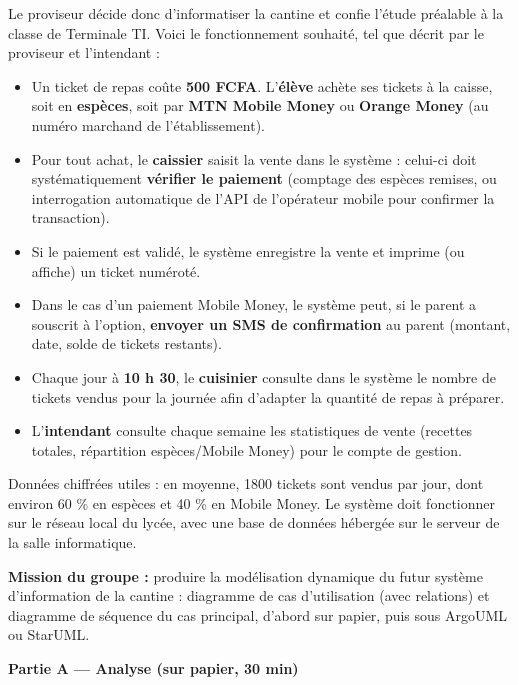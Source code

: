 \documentclass[11pt]{article}
\newcounter{popsec}
\newcounter{popsub}
\newcommand{\courssub}[1]{%
  \stepcounter{popsub}%
  \par\vspace{9pt}\noindent{\popxbold\fontsize{11.5}{13}\selectfont\color{popink}{\color{poporange}\thepopsec.\thepopsub}\hspace{6pt}#1}\par\nopagebreak\vspace{4pt}
}
\begin{document}
Le proviseur décide donc d'informatiser la cantine et confie l'étude préalable à la classe de Terminale TI. Voici le fonctionnement souhaité, tel que décrit par le proviseur et l'intendant :

\begin{itemize}
  \item Un ticket de repas coûte \textbf{500 FCFA}. L'\textbf{élève} achète ses tickets à la caisse, soit en \textbf{espèces}, soit par \textbf{MTN Mobile Money} ou \textbf{Orange Money} (au numéro marchand de l'établissement).
  \item Pour tout achat, le \textbf{caissier} saisit la vente dans le système : celui-ci doit systématiquement \textbf{vérifier le paiement} (comptage des espèces remises, ou interrogation automatique de l'API de l'opérateur mobile pour confirmer la transaction).
  \item Si le paiement est validé, le système enregistre la vente et imprime (ou affiche) un ticket numéroté.
  \item Dans le cas d'un paiement Mobile Money, le système peut, si le parent a souscrit à l'option, \textbf{envoyer un SMS de confirmation} au parent (montant, date, solde de tickets restants).
  \item Chaque jour à \textbf{10 h 30}, le \textbf{cuisinier} consulte dans le système le nombre de tickets vendus pour la journée afin d'adapter la quantité de repas à préparer.
  \item L'\textbf{intendant} consulte chaque semaine les statistiques de vente (recettes totales, répartition espèces/Mobile Money) pour le compte de gestion.
\end{itemize}

Données chiffrées utiles : en moyenne, \num{1800} tickets sont vendus par jour, dont environ 60 \% en espèces et 40 \% en Mobile Money. Le système doit fonctionner sur le réseau local du lycée, avec une base de données hébergée sur le serveur de la salle informatique.

\textbf{Mission du groupe :} produire la modélisation dynamique du futur système d'information de la cantine : diagramme de cas d'utilisation (avec relations) et diagramme de séquence du cas principal, d'abord sur papier, puis sous ArgoUML ou StarUML.

\courssub{Consignes de l'activité}

\textbf{Partie A — Analyse (sur papier, 30 min)}
\end{document}
